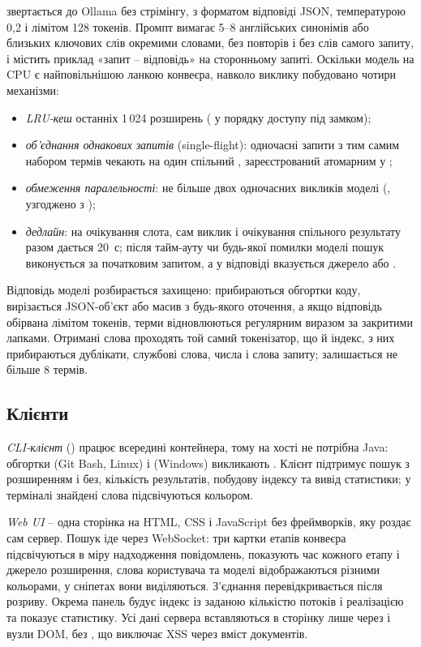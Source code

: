  звертається до Ollama  без стрімінгу, з форматом
відповіді JSON, температурою 0,2 і лімітом 128 токенів. Промпт вимагає 5--8 англійських
синонімів або близьких ключових слів окремими словами, без повторів і без слів самого
запиту, і містить приклад «запит -- відповідь» на сторонньому запиті. Оскільки модель на CPU
є найповільнішою ланкою конвеєра, навколо виклику побудовано чотири механізми:
\begin{itemize}
\item \textit{LRU-кеш} останніх 1\,024 розширень ( у порядку доступу під
замком);
\item \textit{об'єднання однакових запитів} (single-flight): одночасні запити з тим самим
набором термів чекають на один спільний , зареєстрований атомарним
 у ;
\item \textit{обмеження паралельності}: не більше двох одночасних викликів моделі
(, узгоджено з );
\item \textit{дедлайн}: на очікування слота, сам виклик і очікування спільного результату
разом дається 20~с; після тайм-ауту чи будь-якої помилки моделі пошук виконується за
початковим запитом, а у відповіді вказується джерело  або .
\end{itemize}

Відповідь моделі розбирається захищено: прибираються обгортки коду, вирізається JSON-об'єкт
або масив з будь-якого оточення, а якщо відповідь обірвана лімітом токенів, терми
відновлюються регулярним виразом за закритими лапками. Отримані слова проходять той самий
токенізатор, що й індекс, з них прибираються дублікати, службові слова, числа і слова запиту;
залишається не більше 8 термів.

\subsection{Клієнти}

\textit{CLI-клієнт} () працює всередині контейнера, тому на хості не
потрібна Java: обгортки  (Git Bash, Linux) і  (Windows)
викликають . Клієнт підтримує пошук з розширенням і
без, кількість результатів, побудову індексу та вивід статистики; у терміналі знайдені слова
підсвічуються кольором.

\textit{Web UI} -- одна сторінка на HTML, CSS і JavaScript без фреймворків, яку роздає сам
сервер. Пошук іде через WebSocket: три картки етапів конвеєра підсвічуються в міру надходження
повідомлень, показують час кожного етапу і джерело розширення, слова користувача та моделі
відображаються різними кольорами, у сніпетах вони виділяються. З'єднання перевідкривається
після розриву. Окрема панель будує індекс із заданою кількістю потоків і реалізацією та
показує статистику. Усі дані сервера вставляються в сторінку лише через  і
вузли DOM, без , що виключає XSS через вміст документів.

